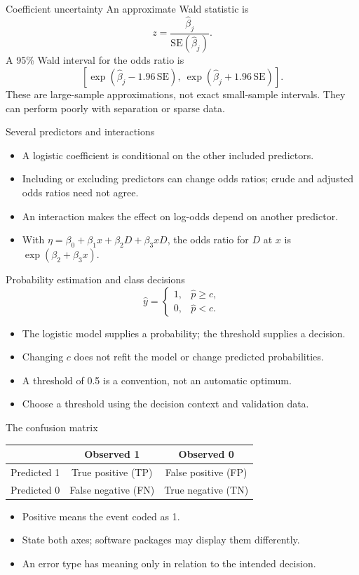 \begin{frame}{Coefficient uncertainty}
An approximate Wald statistic is\[z=\frac{\hat\beta_j}{\mathrm{SE}(\hat\beta_j)}.\]A 95\% Wald interval for the odds ratio is\[\left[\exp(\hat\beta_j-1.96\,\mathrm{SE}),\ \exp(\hat\beta_j+1.96\,\mathrm{SE})\right].\]These are large-sample approximations, not exact small-sample intervals. They can perform poorly with separation or sparse data.
\end{frame}

\begin{frame}{Several predictors and interactions}
\begin{itemize}
\item A logistic coefficient is conditional on the other included predictors.
\item Including or excluding predictors can change odds ratios; crude and adjusted odds ratios need not agree.
\item An interaction makes the effect on log-odds depend on another predictor.
\item With $\eta=\beta_0+\beta_1x+\beta_2D+\beta_3xD$, the odds ratio for $D$ at $x$ is $\exp(\beta_2+\beta_3x)$.
\end{itemize}
\end{frame}

\begin{frame}{Probability estimation and class decisions}
\[\hat y=\begin{cases}1,&\hat p\ge c,\\0,&\hat p<c.\end{cases}\]\begin{itemize}
\item The logistic model supplies a probability; the threshold supplies a decision.
\item Changing $c$ does not refit the model or change predicted probabilities.
\item A threshold of 0.5 is a convention, not an automatic optimum.
\item Choose a threshold using the decision context and validation data.
\end{itemize}
\end{frame}

\begin{frame}{The confusion matrix}
\begin{center}\begin{tabular}{lcc}\toprule
 & Observed 1 & Observed 0\\\midrule Predicted 1 & True positive (TP) & False positive (FP)\\ Predicted 0 & False negative (FN) & True negative (TN)\\
\bottomrule\end{tabular}\end{center}\begin{itemize}
\item Positive means the event coded as 1.
\item State both axes; software packages may display them differently.
\item An error type has meaning only in relation to the intended decision.
\end{itemize}
\end{frame}

